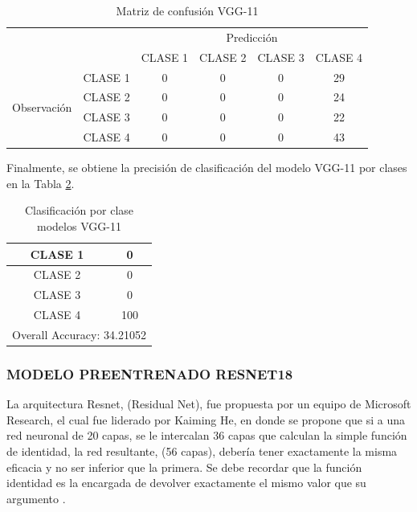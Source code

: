 \newpage
\begin{table}[htbp]
	\centering
	\begin{tabular}{|c|l|c|c|c|c|}
		\hline
		\multicolumn{2}{|c|}{\multirow{2}[4]{*}{}} & \multicolumn{4}{c|}{Predicción} \bigstrut\\
		\cline{3-6}    \multicolumn{2}{|c|}{} & CLASE 1 & CLASE 2 & CLASE 3 & CLASE 4 \bigstrut\\
		\hline
		\multirow{4}[8]{*}{\begin{sideways}Observación\end{sideways}} & CLASE 1 & 0     & 0     & 0    & 29 \bigstrut\\
		\cline{2-6}     & CLASE 2 & 0     & 0     & 0    & 24 \bigstrut\\
		\cline{2-6}      & CLASE 3 & 0     & 0     & 0    & 22 \bigstrut\\
		\cline{2-6}     & CLASE 4 & 0     & 0     & 0    & 43 \bigstrut\\
		\hline
	\end{tabular}%
	\caption{Matriz de confusión VGG-11}
	\label{fig:MC_VGG11}
\end{table}%

Finalmente, se obtiene la precisión de clasificación del modelo VGG-11 por clases en la Tabla \ref{fig:clase_VGG11}.

\begin{table}[ht]
	\centering
	\begin{tabular}{|c|c|}
		\hline
		CLASE 1 & 0 \bigstrut\\
		\hline
		CLASE 2 & 0 \bigstrut\\
		\hline
		CLASE 3 & 0 \bigstrut\\
		\hline
		CLASE 4 & 100 \bigstrut\\
		\hline
		\multicolumn{2}{|c|}{Overall Accuracy: 34.21052} \bigstrut\\
		\hline
	\end{tabular}%
	\caption{Clasificación por clase modelos VGG-11}
	\label{fig:clase_VGG11}
\end{table}%


\newpage
\subsubsection{\MakeUppercase{Modelo preentrenado RESNET18}}
La arquitectura Resnet, (Residual Net), fue propuesta por un equipo de Microsoft Research, el cual fue liderado por Kaiming He, en donde se propone que si a una red neuronal de 20 capas, se le intercalan 36 capas que calculan la simple función de identidad, la red resultante, (56 capas), debería tener exactamente la misma eficacia y no ser inferior que la primera. Se debe recordar que la función identidad es la encargada de devolver exactamente el mismo valor que su argumento \cite{ref_4}.\\


